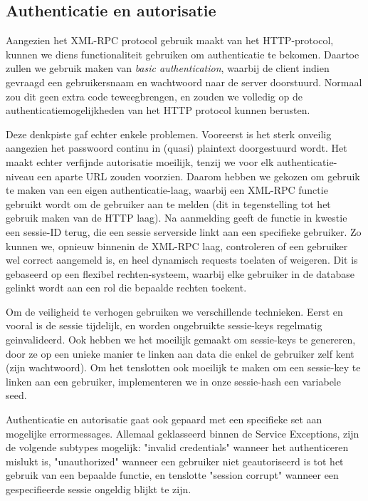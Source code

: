 \subsection{Authenticatie en autorisatie}

Aangezien het XML-RPC protocol gebruik maakt van het HTTP-protocol, kunnen we diens functionaliteit gebruiken om authenticatie te bekomen. Daartoe zullen we gebruik maken van \emph{basic authentication}, waarbij de client indien gevraagd een gebruikersnaam en wachtwoord naar de server doorstuurd. Normaal zou dit geen extra code teweegbrengen, en zouden we volledig op de authenticatiemogelijkheden van het HTTP protocol kunnen berusten.

Deze denkpiste gaf echter enkele problemen. Vooreerst is het sterk onveilig aangezien het passwoord continu in (quasi) plaintext doorgestuurd wordt. Het maakt echter verfijnde autorisatie moeilijk, tenzij we voor elk authenticatie-niveau een aparte URL zouden voorzien. Daarom hebben we gekozen om gebruik te maken van een eigen authenticatie-laag, waarbij een XML-RPC functie gebruikt wordt om de gebruiker aan te melden (dit in tegenstelling tot het gebruik maken van de HTTP laag). Na aanmelding geeft de functie in kwestie een sessie-ID terug, die een sessie serverside linkt aan een specifieke gebruiker. Zo kunnen we, opnieuw binnenin de XML-RPC laag, controleren of een gebruiker wel correct aangemeld is, en heel dynamisch requests toelaten of weigeren. Dit is gebaseerd op een flexibel rechten-systeem, waarbij elke gebruiker in de database gelinkt wordt aan een rol die bepaalde rechten toekent.

Om de veiligheid te verhogen gebruiken we verschillende technieken. Eerst en vooral is de sessie tijdelijk, en worden ongebruikte sessie-keys regelmatig geinvalideerd. Ook hebben we het moeilijk gemaakt om sessie-keys te genereren, door ze op een unieke manier te linken aan data die enkel de gebruiker zelf kent (zijn wachtwoord). Om het tenslotten ook moeilijk te maken om een sessie-key te linken aan een gebruiker, implementeren we in onze sessie-hash een variabele seed.

Authenticatie en autorisatie gaat ook gepaard met een specifieke set aan mogelijke errormessages. Allemaal geklasseerd binnen de Service Exceptions, zijn de volgende subtypes mogelijk: "invalid credentials" wanneer het authenticeren mislukt is, "unauthorized" wanneer een gebruiker niet geautoriseerd is tot het gebruik van een bepaalde functie, en tenslotte "session corrupt" wanneer een gespecifieerde sessie ongeldig blijkt te zijn.

